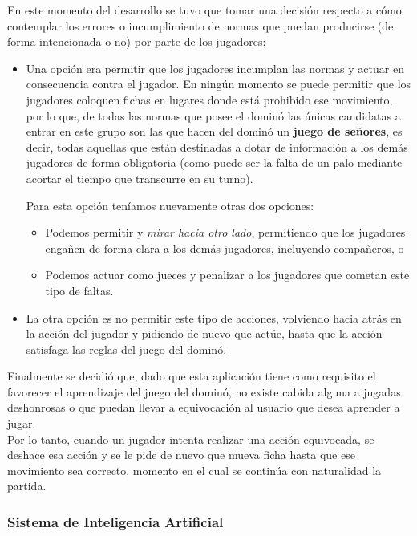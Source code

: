En este momento del desarrollo se tuvo que tomar una decisión respecto a cómo contemplar los errores o incumplimiento de
normas que puedan producirse (de forma intencionada o no) por parte de los jugadores:

\begin{itemize}
    \item Una opción era permitir que los jugadores incumplan las normas y actuar en consecuencia contra el jugador.
            En ningún momento se puede permitir que los jugadores coloquen fichas en lugares donde está prohibido
            ese movimiento, por lo que, de todas las normas que posee el dominó las únicas candidatas a entrar en este
            grupo son las que hacen del dominó un \textbf{juego de señores}, es decir, todas aquellas que están destinadas
            a dotar de información a los demás jugadores de forma obligatoria (como puede ser la falta de un palo mediante
            acortar el tiempo que transcurre en su turno).

            Para esta opción teníamos nuevamente otras dos opciones:
            \begin{itemize}
                \item Podemos permitir y \emph{mirar hacia otro lado}, permitiendo que los jugadores engañen de forma
                        clara a los demás jugadores, incluyendo compañeros, o
                \item Podemos actuar como jueces y penalizar a los jugadores que cometan este tipo de faltas.
            \end{itemize}
    \item La otra opción es no permitir este tipo de acciones, volviendo hacia atrás en la acción del jugador y
            pidiendo de nuevo que actúe, hasta que la acción satisfaga las reglas del juego del dominó.
\end{itemize}

Finalmente se decidió que, dado que esta aplicación tiene como requisito el favorecer el aprendizaje del juego del dominó,
no existe cabida alguna a jugadas deshonrosas o que puedan llevar a equivocación al usuario que desea aprender a jugar. \\

Por lo tanto, cuando un jugador intenta realizar una acción equivocada, se deshace esa acción y se le pide de nuevo que
mueva ficha hasta que ese movimiento sea correcto, momento en el cual se continúa con naturalidad la partida.


\subsubsection{Sistema de Inteligencia Artificial}

